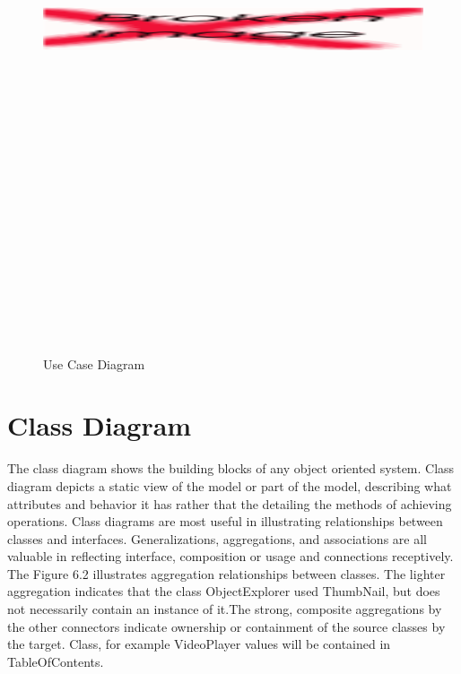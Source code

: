 \documentclass[openany,12pt]{report}
\begin{document}
\begin{figure}[H]
\centering
\includegraphics[angle=90,height=7.5in]{./metbkc}
\caption{Use Case Diagram}
\end{figure}

\newpage
\section{Class Diagram}
\hspace*{0.5in}The class diagram shows the building blocks of any object oriented system. Class diagram depicts a static view of the model or part of the model, describing what attributes and behavior it has rather that the detailing the methods of achieving operations. Class diagrams are most useful in illustrating relationships between classes and interfaces. Generalizations, aggregations, and associations are all valuable in reflecting interface, composition or usage and connections receptively.\\
\hspace*{0.5in}The Figure 6.2 illustrates aggregation relationships between classes. The lighter aggregation indicates that the class ObjectExplorer used ThumbNail, but does not necessarily contain an instance of it.The strong, composite aggregations by the other connectors indicate ownership or containment of the source classes by the target. Class, for example VideoPlayer  values will be contained in TableOfContents.
\end{document}
